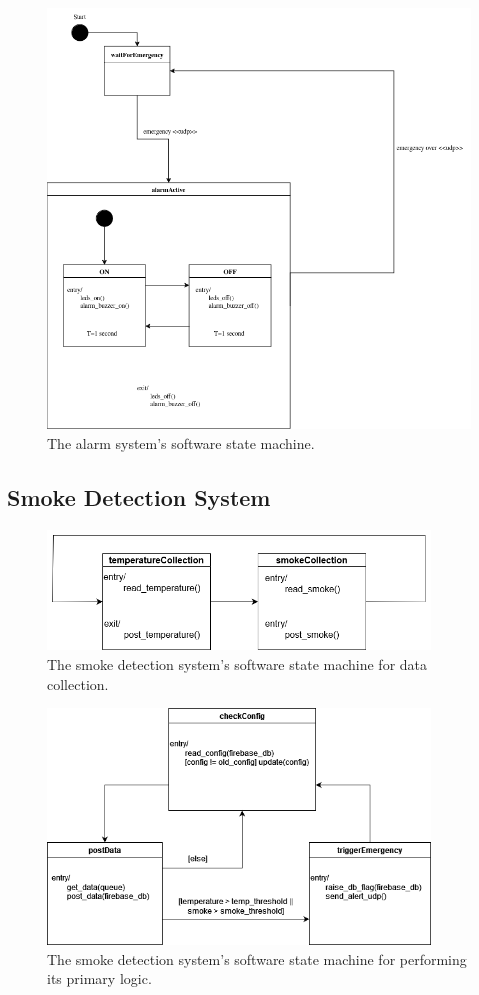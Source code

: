 \begin{figure}[H]
    \centering
    \includegraphics[width=5in]{../assets/state-machine/AlarmSystemStateMachine.png}
    \caption{The alarm system's software state machine.}
\end{figure}

\subsection{Smoke Detection System}

\begin{figure}[H]
    \centering
    \includegraphics[width=4in]{../assets/state-machine/DataCollectionStateMachine.png}
    \caption{The smoke detection system's software state machine for data collection.}
\end{figure}

\begin{figure}[H]
    \centering
    \includegraphics[width=4in]{../assets/state-machine/DataCollectionLogicLoop.png}
    \caption{The smoke detection system's software state machine for performing its primary logic.}
\end{figure}

